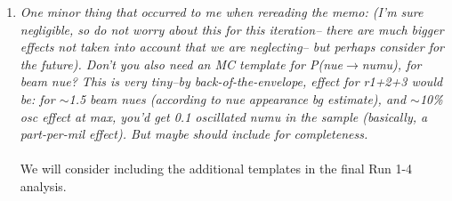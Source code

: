 \begin{enumerate}
\vspace{5 mm}
\item
{\em
  One minor thing that occurred to me when rereading the memo:
  (I'm sure negligible, so do not worry about this for this iteration-- 
  there are much bigger effects not taken into account that we are neglecting-- 
  but perhaps consider for the future).
  Don't you also need an MC template for P(nue$\rightarrow$numu), for beam nue?  This is very tiny--by back-of-the-envelope,
  effect for r1+2+3 would be: for $\sim$1.5 beam nues (according to nue appearance bg estimate), and $\sim$10\% 
  osc effect at max, you'd get 0.1 oscillated numu in the sample (basically, a part-per-mil effect).
  But maybe should include for completeness.
}\\
\\
We will consider including the additional templates in the final Run 1-4 analysis.  

\end{enumerate}
